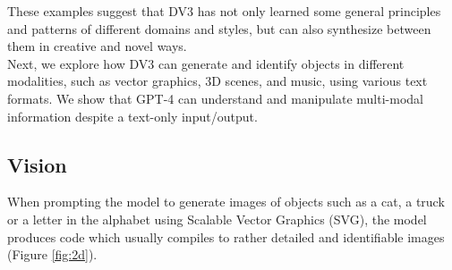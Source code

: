 These examples suggest that DV3 has not only learned some general principles and patterns of different domains and styles, but can also synthesize between them in creative and novel ways. \\

Next, we explore how DV3 can generate and identify objects in different modalities, such as vector graphics, 3D scenes, and music, using various text formats. We show that GPT-4 can understand and manipulate multi-modal information despite a text-only input/output.
\newpage
\subsection{Vision}
When prompting the model to generate images of objects such as a cat, a truck or a letter in the alphabet using Scalable Vector Graphics (SVG), the model produces code which usually compiles to rather detailed and identifiable images (Figure \ref{fig:2d}). 

